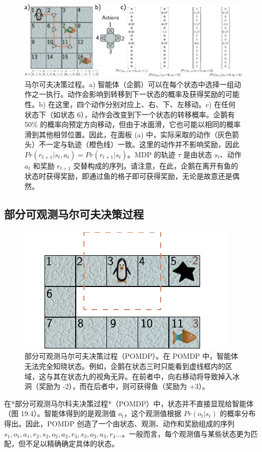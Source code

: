 \documentclass[lang=cn,newtx,10pt,scheme=chinese]{elegantbook}
\begin{document}
\begin{figure}[ht!]
\centering
\includegraphics[width=0.7\linewidth]{PDFFigures/UDLChap19PDF/ReinforceMDP3.pdf}
\caption{马尔可夫决策过程。a) 智能体（企鹅）可以在每个状态中选择一组动作之一执行。动作会影响到转移到下一状态的概率及获得奖励的可能性。b) 在这里，四个动作分别对应上、右、下、左移动。c) 在任何状态下（如状态 6），动作会改变到下一个状态的转移概率。企鹅有 50\% 的概率向预定方向移动，但由于冰面滑，它也可能以相同的概率滑到其他相邻位置。因此，在面板 (a) 中，实际采取的动作（灰色箭头）不一定与轨迹（橙色线）一致。这里的动作并不影响奖励，因此 \(Pr(r_{t+1}|s_t, a_t) = Pr(r_{t+1}|s_t)\)。MDP 的轨迹 \(\tau\) 是由状态 \(s_t\)、动作 \(a_t\) 和奖励 \(r_{t+1}\) 交替构成的序列。请注意，在此，企鹅在离开有鱼的状态时获得奖励，即通过鱼的格子即可获得奖励，无论是故意还是偶然。}
\end{figure}

\subsection{部分可观测马尔可夫决策过程}
\begin{figure}[ht!]
\centering
\includegraphics[width=0.7\linewidth]{PDFFigures/UDLChap19PDF/ReinforcePOMDP.pdf}
\caption{部分可观测马尔可夫决策过程（POMDP）。在 POMDP 中，智能体无法完全知晓状态。例如，企鹅在状态三时只能看到虚线框内的区域，这与其在状态九的视角无异。在前者中，向右移动将导致掉入冰洞（奖励为 -2），而在后者中，则可获得鱼（奖励为 +3）。}
\end{figure}
在*部分可观测马尔科夫决策过程*（POMDP）中，状态并不直接显现给智能体（图 19.4）。智能体得到的是观测值 \(o_t\)，这个观测值根据 \(Pr(o_t|s_t)\) 的概率分布得出。因此，POMDP 创造了一个由状态、观测、动作和奖励组成的序列 \(s_1, o_1, a_1, r_2, s_2, o_2, a_2, r_3, s_3, o_3, a_3, r_4 \ldots\)。一般而言，每个观测值与某些状态更为匹配，但不足以精确确定具体的状态。
\end{document}
